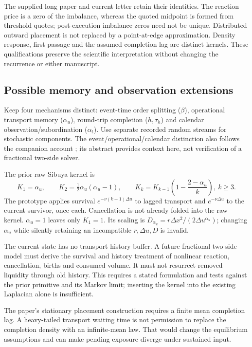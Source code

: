\documentclass[11pt,a4paper]{article}
\newcommand{\du}{\Delta u}\newcommand{\dx}{\Delta x}\newcommand{\lap}{\delta_x^2}
\begin{document}
The supplied long paper and current letter retain their identities. The reaction price is a zero of the imbalance, whereas the quoted midpoint is formed from threshold quotes; post-execution imbalance zeros need not be unique. Distributed outward placement is not replaced by a point-at-edge approximation. Density response, first passage and the assumed completion lag are distinct kernels. These qualifications preserve the scientific interpretation without changing the recurrence or either manuscript.

\subsection{Possible memory and observation extensions}
Keep four mechanisms distinct: event-time order splitting ($\beta$),
operational transport memory ($\alpha_u$), round-trip completion ($h,\tau_h$)
and calendar observation/subordination ($\alpha_t$). Use separate recorded random streams for stochastic components. The event/operational/calendar
distinction also follows the companion account \cite{clocks}; its abstract
provides context here, not verification of a fractional two-side solver.

The prior raw Sibuya kernel is
\[
 K_1=\alpha_u,\qquad K_2=\tfrac12\alpha_u(\alpha_u-1),\qquad
 K_k=K_{k-1}\left(1-\frac{2-\alpha_u}{k}\right),\ k\geq3.
\]
The prototype applies survival $e^{-\nu(k-1)\du}$ to lagged transport
and $e^{-\nu\du}$ to the current survivor, once each. Cancellation is not
already folded into the raw kernel. $\alpha_u=1$ leaves only $K_1=1$.
Its scaling is $D_{\alpha_u}=r\dx^2/(2\du^{\alpha_u})$; changing
$\alpha_u$ while silently retaining an incompatible $r,\du,D$ is invalid.

The current state has no transport-history buffer. A future fractional
two-side model must derive the survival and history treatment of nonlinear
reaction, cancellation, births and consumed volume. It must not resurrect
removed liquidity through old history. This requires a stated formulation
and tests against the prior primitive and its Markov limit; inserting the
kernel into the existing Laplacian alone is insufficient.

The paper's stationary placement construction requires a finite mean
completion lag. A heavy-tailed transport waiting time is not permission to
replace the completion density with an infinite-mean law. That would change
the equilibrium assumptions and can make pending exposure diverge under
sustained input.
\end{document}

